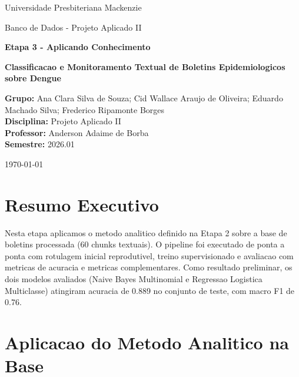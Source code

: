 \documentclass[12pt,a4paper]{article}
\begin{document}
\begin{titlepage}
    \centering
    {\large Universidade Presbiteriana Mackenzie \par}
    \vspace{0.4cm}
    {\large Banco de Dados - Projeto Aplicado II \par}
    \vspace{1.8cm}
    {\Large \textbf{Etapa 3 - Aplicando Conhecimento} \par}
    \vspace{0.5cm}
    {\large \textbf{Classificacao e Monitoramento Textual de Boletins Epidemiologicos sobre Dengue} \par}
    \vfill
    \begin{flushleft}
    \textbf{Grupo:} Ana Clara Silva de Souza; Cid Wallace Araujo de Oliveira; Eduardo Machado Silva; Frederico Ripamonte Borges \\
    \textbf{Disciplina:} Projeto Aplicado II \\
    \textbf{Professor:} Anderson Adaime de Borba \\
    \textbf{Semestre:} 2026.01
    \end{flushleft}
    \vfill
    {\large \today \par}
\end{titlepage}

\section*{Resumo Executivo}
Nesta etapa aplicamos o metodo analitico definido na Etapa 2 sobre a base de boletins processada (60 chunks textuais). O pipeline foi executado de ponta a ponta com rotulagem inicial reprodutivel, treino supervisionado e avaliacao com metricas de acuracia e metricas complementares. Como resultado preliminar, os dois modelos avaliados (Naive Bayes Multinomial e Regressao Logistica Multiclasse) atingiram acuracia de 0.889 no conjunto de teste, com macro F1 de 0.76.

\section{Aplicacao do Metodo Analitico na Base}
\end{document}
